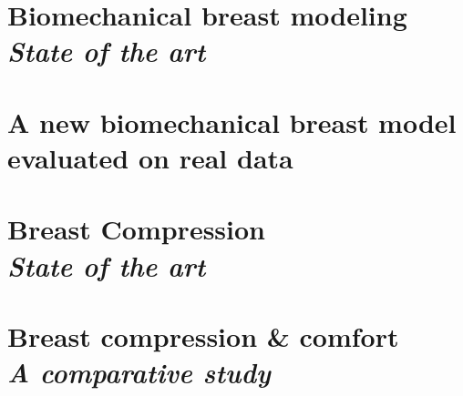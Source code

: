 \documentclass[a4paper,12pt,twoside]{report}
\begin{document}
\chapter{Biomechanical breast modeling\\ \textit{State of the art}}\label{chapter:bioMecaModelsBackground}



\chapter{A new biomechanical breast model evaluated on real data}\label{chapter:myBioMecaModel}




\clearemptydoublepage
\chapter{Breast Compression\\ \textit{State of the art} }\label{chapter:compression:introduction}


\chapter{Breast compression \& comfort \\ \textit{A comparative study}}
\label{chapter:compressionfem}


\clearemptydoublepage




\clearemptydoublepage
\end{document}

